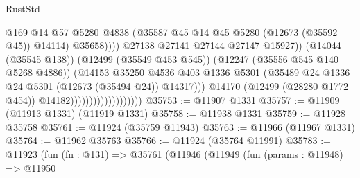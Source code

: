\begin{lexlean}{RustStd}
\begin{coremodule}
{\begin{coremodule}
{{{{{{{{{{{{{{{{{{{{{{{{{{{{{{{{{{{{{{{{{{{{{{{{{{{{{{{{{{{{{{{{{{{{{{{{{{{{{{{{                                                        @169
                                                        @14
                                                        @57
                                                        @5280
                                                        @4838
                                                        (@35587
                                                          @45
                                                          @14
                                                          @45
                                                          @5280
                                                          (@12673 (@35592 @45))
                                                          @14114)
                                                        @35658))))
                                                @27138
                                                @27141
                                                @27144
                                                @27147
                                                @15927))
                                            (@14044 (@35545 @138))
                                            (@12499 (@35549 @453 @545))
                                            (@12247 (@35556 @545 @140 @5268 @4886))
                                            (@14153
                                              @35250
                                              @4536
                                              @403
                                              @1336
                                              @5301
                                              (@35489
                                                @24
                                                @1336
                                                @24
                                                @5301
                                                (@12673 (@35494 @24))
                                                @14317)))
                                          @14170
                                          (@12499 (@28280 @1772 @454))
                                          @14182)))))))))))))))))))
@35753 := @11907 @1331
@35757 := @11909 (@11913 @1331) (@11919 @1331)
@35758 := @11938 @1331
@35759 := @11928 @35758
@35761 := @11924 (@35759 @11943)
@35763 := @11966 (@11967 @1331)
@35764 := @11962 @35763
@35766 := @11924 (@35764 @11991)
@35783 := @11923
    (fun (fn : @131) =>
    @35761
      (@11946
        (@11949
          (fun (params : @11948) =>
          @11950
}}}}}}}}}}}}}}}}}}}}}}}}}}}}}}}}}}}}}}}}}}}}}}}}}}}}}}}}}}}}}}}}}}}}}}}}}}}}}}}}
\end{coremodule}}
\end{coremodule}
\end{lexlean}
